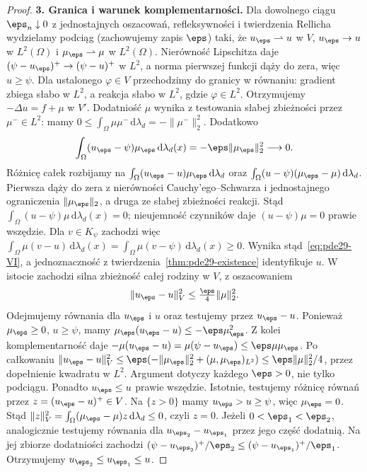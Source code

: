 \begin{proof}
\textbf{3. Granica i warunek komplementarności.}
Dla dowolnego ciągu $\eps_n\downarrow0$
z jednostajnych oszacowań, refleksywności i twierdzenia
Rellicha wydzielamy podciąg (zachowujemy zapis $\eps$)
taki, że $u_\eps\rightharpoonup u$ w $V$,
$u_\eps\to u$ w $L^2(\Omega)$ i
$\mu_\eps\rightharpoonup\mu$ w $L^2(\Omega)$.
Nierówność Lipschitza daje
$(\psi-u_\eps)^+\to(\psi-u)^+$ w $L^2$,
a norma pierwszej funkcji dąży do zera, więc $u\ge\psi$.
Dla ustalonego $\varphi\in V$ przechodzimy
do granicy w równaniu: gradient zbiega słabo w $L^2$,
a reakcja słabo w $L^2$, gdzie $\varphi\in L^2$.
Otrzymujemy $-\Delta u=f+\mu$ w $V'$.
Dodatniość $\mu$ wynika z testowania słabej
zbieżności przez $\mu^-\in L^2$: mamy
$0\le\int_\Omega\mu\mu^-\,\mathrm d\lambda_d
=-\|\mu^-\|_2^2$.
Dodatkowo
\[
 \int_\Omega(u_\eps-\psi)\mu_\eps\,\mathrm d\lambda_d(x)
 =-\eps\|\mu_\eps\|_2^2\longrightarrow0.
\]
Różnicę całek rozbijamy na
$\int_\Omega(u_\eps-u)\mu_\eps\,\mathrm d\lambda_d$
oraz $\int_\Omega(u-\psi)(\mu_\eps-\mu)\,\mathrm d\lambda_d$.
Pierwsza dąży do zera z nierówności
Cauchy'ego--Schwarza i jednostajnego ograniczenia
$\|\mu_\eps\|_2$, a druga ze słabej zbieżności reakcji. Stąd
$\int_\Omega(u-\psi)\mu\,\mathrm d\lambda_d(x)=0$;
nieujemność czynników daje $(u-\psi)\mu=0$ prawie wszędzie.
Dla $v\in K_\psi$ zachodzi więc
$\int_\Omega\mu(v-u)\,\mathrm d\lambda_d(x)
 =\int_\Omega\mu(v-\psi)\,\mathrm d\lambda_d(x)\ge0$.
Wynika stąd~\eqref{eq:pde29-VI}, a jednoznaczność z
twierdzenia~\ref{thm:pde29-existence} identyfikuje $u$.
W istocie zachodzi silna zbieżność całej rodziny
w $V$, z oszacowaniem
\[
 \|u_\eps-u\|_V^2\le\tfrac{\eps}{4}\|\mu\|_2^2.
\]
Odejmujemy równania dla $u_\eps$ i $u$ oraz testujemy
przez $u_\eps-u$. Ponieważ $\mu_\eps\ge0$, $u\ge\psi$,
mamy $\mu_\eps(u_\eps-u)\le-\eps\mu_\eps^2$.
Z kolei komplementarność daje
$-\mu(u_\eps-u)=\mu(\psi-u_\eps)\le\eps\mu\mu_\eps$.
Po całkowaniu
$\|u_\eps-u\|_V^2\le
\eps(-\|\mu_\eps\|_2^2+(\mu,\mu_\eps)_{L^2})
\le\eps\|\mu\|_2^2/4$,
przez dopełnienie kwadratu w $L^2$.
Argument dotyczy każdego $\eps>0$, nie tylko podciągu.
Ponadto $u_\eps\le u$ prawie wszędzie.
Istotnie, testujemy różnicę równań przez
$z=(u_\eps-u)^+\in V$. Na $\{z>0\}$ mamy
$u_\eps>u\ge\psi$, więc $\mu_\eps=0$.
Stąd $\|z\|_V^2=\int_\Omega(\mu_\eps-\mu)z
\,\mathrm d\lambda_d\le0$, czyli $z=0$.
Jeżeli $0<\eps_1<\eps_2$, analogicznie
testujemy równania dla $u_{\eps_2}-u_{\eps_1}$
przez jego część dodatnią. Na jej zbiorze
dodatniości zachodzi
$(\psi-u_{\eps_2})^+/\eps_2\le
(\psi-u_{\eps_1})^+/\eps_1$.
Otrzymujemy $u_{\eps_2}\le u_{\eps_1}\le u$.


\end{proof}
